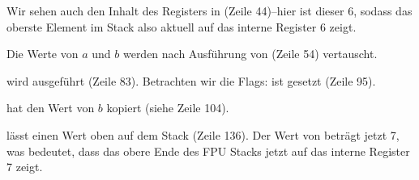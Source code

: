 Wir sehen auch den Inhalt des  Registers in  (Zeile
44)--hier ist dieser 6, sodass das oberste Element im Stack also aktuell auf das
interne Register 6 zeigt.

Die Werte von $a$ und $b$ werden nach Ausführung von  (Zeile 54)
vertauscht.

 wird ausgeführt (Zeile 83).
Betrachten wir die Flags: \CF ist gesetzt (Zeile 95).

 hat den Wert von $b$ kopiert (siehe Zeile 104).

\FSTP lässt einen Wert oben auf dem Stack (Zeile 136).
Der Wert von  beträgt jetzt 7, was bedeutet, dass das obere Ende des
FPU Stacks jetzt auf das interne Register 7 zeigt.
